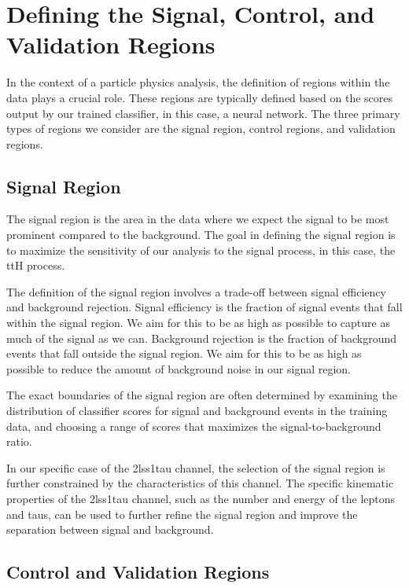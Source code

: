 \section{Defining the Signal, Control, and Validation Regions}

In the context of a particle physics analysis, the definition of regions within the data plays a crucial role. These
regions are typically defined based on the scores output by our trained classifier, in this case, a neural network. The
three primary types of regions we consider are the signal region, control regions, and validation regions.

\subsection{Signal Region}

The signal region is the area in the data where we expect the signal to be most prominent compared to the background.
The goal in defining the signal region is to maximize the sensitivity of our analysis to the signal process, in this
case, the ttH process.

The definition of the signal region involves a trade-off between signal efficiency and background rejection. Signal
efficiency is the fraction of signal events that fall within the signal region. We aim for this to be as high as
possible to capture as much of the signal as we can. Background rejection is the fraction of background events that fall
outside the signal region. We aim for this to be as high as possible to reduce the amount of background noise in our
signal region.

The exact boundaries of the signal region are often determined by examining the distribution of classifier scores for
signal and background events in the training data, and choosing a range of scores that maximizes the
signal-to-background ratio.

In our specific case of the 2lss1tau channel, the selection of the signal region is further constrained by the
characteristics of this channel. The specific kinematic properties of the 2lss1tau channel, such as the number and
energy of the leptons and taus, can be used to further refine the signal region and improve the separation between
signal and background.

\subsection{Control and Validation Regions}

